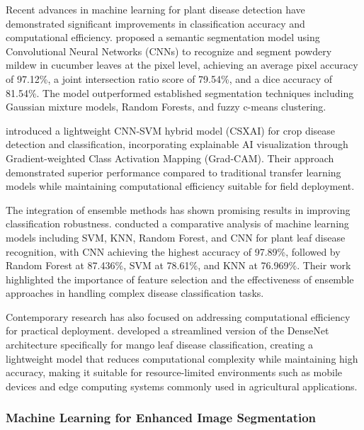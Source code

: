\documentclass[sn-mathphys]{sn-jnl}
\theoremstyle{thmstyleone}%
\theoremstyle{thmstyletwo}%
\theoremstyle{thmstylethree}%
\begin{document}
Recent advances in machine learning for plant disease detection have demonstrated significant improvements in classification accuracy and computational efficiency. \citet{lin2019deep} proposed a semantic segmentation model using Convolutional Neural Networks (CNNs) to recognize and segment powdery mildew in cucumber leaves at the pixel level, achieving an average pixel accuracy of 97.12\%, a joint intersection ratio score of 79.54\%, and a dice accuracy of 81.54\%. The model outperformed established segmentation techniques including Gaussian mixture models, Random Forests, and fuzzy c-means clustering. 

\citet{prince2024csxai} introduced a lightweight CNN-SVM hybrid model (CSXAI) for crop disease detection and classification, incorporating explainable AI visualization through Gradient-weighted Class Activation Mapping (Grad-CAM). Their approach demonstrated superior performance compared to traditional transfer learning models while maintaining computational efficiency suitable for field deployment.

The integration of ensemble methods has shown promising results in improving classification robustness. \citet{hatuwal2020plant} conducted a comparative analysis of machine learning models including SVM, KNN, Random Forest, and CNN for plant leaf disease recognition, with CNN achieving the highest accuracy of 97.89\%, followed by Random Forest at 87.436\%, SVM at 78.61\%, and KNN at 76.969\%. Their work highlighted the importance of feature selection and the effectiveness of ensemble approaches in handling complex disease classification tasks.

Contemporary research has also focused on addressing computational efficiency for practical deployment. \citet{mahmud2024light} developed a streamlined version of the DenseNet architecture specifically for mango leaf disease classification, creating a lightweight model that reduces computational complexity while maintaining high accuracy, making it suitable for resource-limited environments such as mobile devices and edge computing systems commonly used in agricultural applications.



\subsubsection{Machine Learning for Enhanced Image Segmentation}
\end{document}
